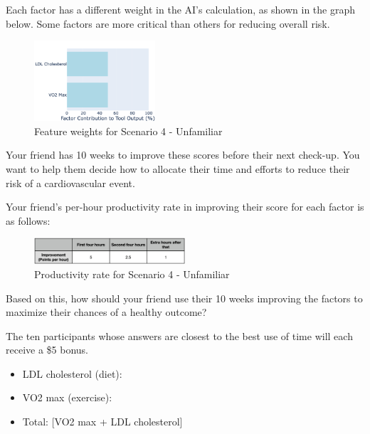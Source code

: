 Each factor has a different weight in the AI’s calculation, as shown in the graph below. Some factors are more critical than others for reducing overall risk.
\begin{figure}[ht]
    \centering
    \includegraphics[width=0.4\textwidth]{Figures/2_unf_bal.png}
    \caption{Feature weights for Scenario 4 - Unfamiliar}
    \label{fig:survey-weights-scenario4-unf}
\end{figure}

Your friend has 10 weeks to improve these scores before their next check-up. You want to help them decide how to allocate their time and efforts to reduce their risk of a cardiovascular event.

Your friend’s per-hour productivity rate in improving their score for each factor is as follows:

\begin{figure}[ht]
    \centering
    \includegraphics[width=0.5\textwidth]{Figures/rate-unf.png}
    \caption{Productivity rate for Scenario 4 - Unfamiliar}
    \label{fig:survey-cost-scenario4-unf}
\end{figure}

Based on this, how should your friend use their 10 weeks improving the factors to maximize their chances of a healthy outcome?

The ten participants whose answers are closest to the best use of time will each receive a \$5 bonus. 

\begin{itemize}
    \item LDL cholesterol (diet): \underline{\hspace{3cm}}
    \item VO2 max (exercise): \underline{\hspace{3cm}}
    \item Total: [VO2 max + LDL cholesterol]
\end{itemize}